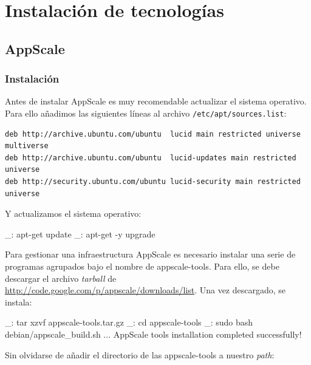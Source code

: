 \chapter{Instalación de tecnologías}
\label{anx:instalacion}


\section{AppScale}
\label{anx:inst-appscale}


\subsection{Instalación}

Antes de instalar AppScale es muy recomendable actualizar el sistema operativo. Para ello añadimos las siguientes líneas al archivo \texttt{/etc/apt/sources.list}:

\begin{lstlisting}
deb http://archive.ubuntu.com/ubuntu  lucid main restricted universe multiverse
deb http://archive.ubuntu.com/ubuntu  lucid-updates main restricted universe
deb http://security.ubuntu.com/ubuntu lucid-security main restricted universe
\end{lstlisting}

Y actualizamos el sistema operativo:

\begin{bashcode}
_: apt-get update
_: apt-get -y upgrade
\end{bashcode}

Para gestionar una infraestructura AppScale es necesario instalar una serie de programas agrupados bajo el nombre de appscale-tools. Para ello, se debe descargar el archivo \emph{tarball} de \url{http://code.google.com/p/appscale/downloads/list}. Una vez descargado, se instala:

\begin{bashcode}
_: tar xzvf appscale-tools.tar.gz
_: cd appscale-tools
_: sudo bash debian/appscale_build.sh
...
AppScale tools installation completed successfully!
\end{bashcode}

Sin olvidarse de añadir el directorio de las appscale-tools a nuestro \emph{path}:


